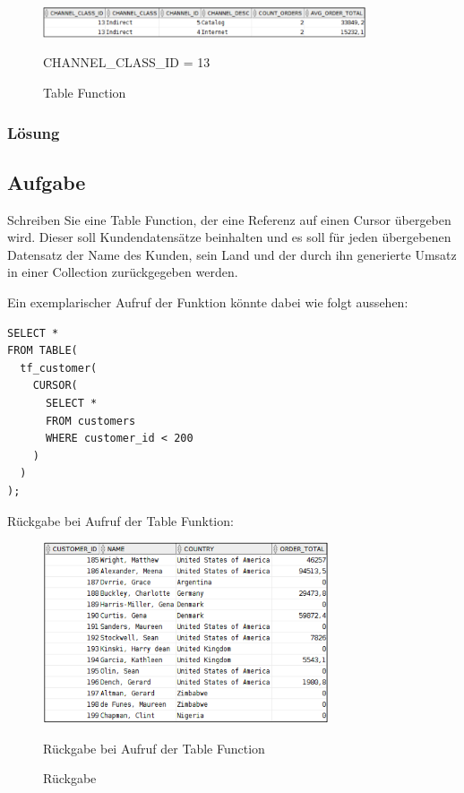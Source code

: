 \begin{figure}[H]
  \centering
  \includegraphics[width=0.85\textwidth]{img//uebung_02_-_aufgabe_02.png}
  \label{img:uebung_02_-_aufgabe_02}
  \caption{Table Function}{CHANNEL\_CLASS\_ID = 13}
\end{figure}


\subsubsection*{Lösung}
\label{sec:uebung_02.aufgabe_02.loesung}


\subsection{Aufgabe}
\label{sec:uebung_02.aufgabe_03}
Schreiben Sie eine Table Function, der eine Referenz auf einen Cursor übergeben wird. Dieser soll Kundendatensätze beinhalten und es soll für jeden übergebenen Datensatz der Name des Kunden, sein Land und der durch ihn generierte Umsatz in einer Collection zurückgegeben werden.

Ein exemplarischer Aufruf der Funktion könnte dabei wie folgt aussehen:
\begin{verbatim}
SELECT *
FROM TABLE(
  tf_customer(
    CURSOR(
      SELECT *
      FROM customers
      WHERE customer_id < 200
    )
  )
);
\end{verbatim}

Rückgabe bei Aufruf der Table Funktion:
\begin{figure}[H]
  \centering
  \includegraphics[width=0.75\textwidth]{img//uebung_02_-_aufgabe_03.png}
  \label{img:uebung_02_-_aufgabe_03}
  \caption{Rückgabe}{Rückgabe bei Aufruf der Table Function}
\end{figure}

